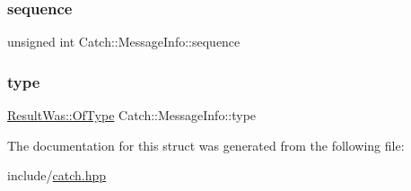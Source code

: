 \mbox{\label{structCatch_1_1MessageInfo_a7f4f57ea21e50160adefce7b68a781d6}} 
\subsubsection{\texorpdfstring{sequence}{sequence}}
{\footnotesize\ttfamily unsigned int Catch\+::\+Message\+Info\+::sequence}

\mbox{\label{structCatch_1_1MessageInfo_ae928b9117465c696e45951d9d0284e78}} 
\subsubsection{\texorpdfstring{type}{type}}
{\footnotesize\ttfamily \mbox{\hyperlink{structCatch_1_1ResultWas_a624e1ee3661fcf6094ceef1f654601ef}{Result\+Was\+::\+Of\+Type}} Catch\+::\+Message\+Info\+::type}



The documentation for this struct was generated from the following file\+:\begin{DoxyCompactItemize}
\item 
include/\mbox{\hyperlink{catch_8hpp}{catch.\+hpp}}\end{DoxyCompactItemize}
